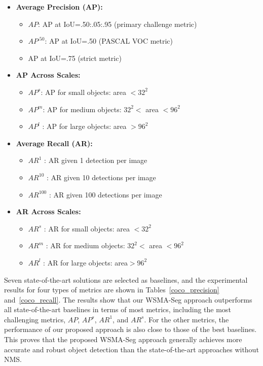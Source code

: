\documentclass{article}
\begin{document}
\begin{small}
\begin{itemize}
  \item \textbf{Average Precision (AP):}
  \begin{itemize}[noitemsep]
     \item $AP$: AP at IoU=.50:.05:.95 (primary challenge metric)
     \item $AP^{.50}$: AP at IoU=.50 (PASCAL VOC metric)
     \item AP at IoU=.75 (strict metric)
  \end{itemize}
  \item \textbf{AP Across Scales:}
  \begin{itemize}[noitemsep]
     \item $AP^{s}$: AP for small objects: area  $<32^2$
     \item $AP^{m}$: AP for medium objects: $32^2<$  area  $<96^2$
     \item $AP^{l}$ : AP for large objects: area  $>96^2$
  \end{itemize}
  \item \textbf{Average Recall (AR):}
  \begin{itemize}[noitemsep]
     \item $AR^{1}$ : AR given 1 detection per image
     \item $AR^{10}$ : AR given 10 detections per image
     \item $AR^{100}$ : AR given 100 detections per image
  \end{itemize}
  \item \textbf{AR Across Scales:}
  \begin{itemize}[noitemsep]
     \item $AR^{s}$ : AR for small objects: area  $<32^2$
     \item $AR^{m}$ : AR for medium objects: $32^2<$ area $< 96^2$
     \item $AR^{l}$ : AR for large objects: area$>96^2$
  \end{itemize}
\end{itemize}
\end{small}
Seven state-of-the-art solutions are selected as baselines, and the experimental results for four types of metrics are shown in Tables~\ref{coco_precision} and~\ref{coco_recall}. The results show that our WSMA-Seg approach outperforms all state-of-the-art baselines in terms of most metrics, including the most challenging metrics, $AP$, $AP^s$, $AR^1$, and $AR^s$. For the other metrics, the performance of our proposed approach is also close to those of the best baselines. This proves that the proposed WSMA-Seg
approach generally achieves more accurate and robust object detection than the state-of-the-art approaches without NMS.
\end{document}
